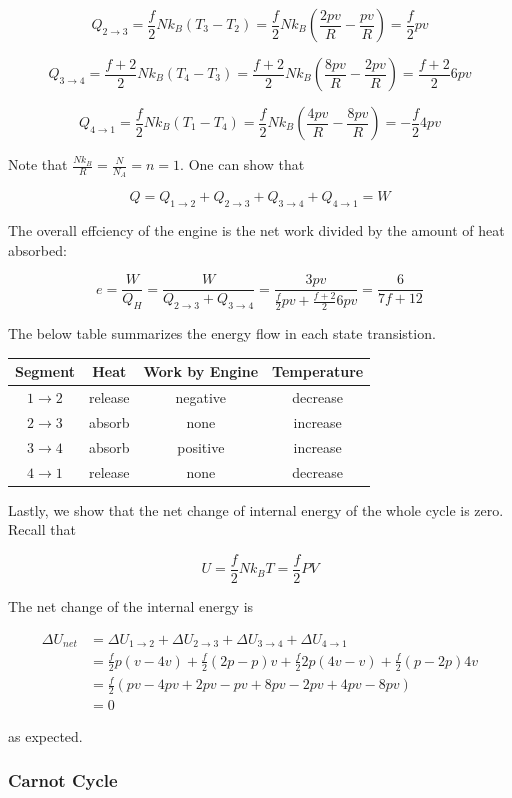 \documentclass[12pt, a4paper]{article}
\begin{document}
\[Q_{2\to3}=\frac{f}{2} Nk_B(T_3-T_2)=\frac{f}{2} Nk_B\left(\frac{2pv}{R}-\frac{pv}{R}\right)=\frac{f}{2} pv\]

\[Q_{3\to4}=\frac{f+2}{2} Nk_B(T_4-T_3)=\frac{f+2}{2} Nk_B\left(\frac{8pv}{R}-\frac{2pv}{R}\right)=\frac{f+2}{2} 6pv\]

\[Q_{4\to1}=\frac{f}{2} Nk_B(T_1-T_4)=\frac{f}{2} Nk_B\left(\frac{4pv}{R}-\frac{8pv}{R}\right)=-\frac{f}{2} 4pv\]

Note that $\frac{Nk_B}{R}=\frac{N}{N_A}=n=1$. One can show that

\[Q=Q_{1\to2}+Q_{2\to3}+Q_{3\to4}+Q_{4\to1}=W\]

The overall effciency of the engine is the net work divided by the amount of heat absorbed:

\[e=\frac{W}{Q_H}=\frac{W}{Q_{2\to3}+Q_{3\to4}}=\frac{3pv}{\frac{f}{2} pv+\frac{f+2}{2} 6pv}=\frac{6}{7f+12}\]

The below table summarizes the energy flow in each state transistion.

\begin{center}
\begin{tabular}{c|c|c|c}
  Segment & Heat & Work \textbf{by} Engine & Temperature \\
  \hline
  $1\to2$ & release & negative & decrease \\
  \hline
  $2\to3$ & absorb & none & increase \\
  \hline
  $3\to4$ & absorb & positive & increase \\
  \hline
  $4\to1$ & release & none & decrease
\end{tabular}
\end{center}

Lastly, we show that the net change of internal energy of the whole cycle is zero. Recall that

\[U=\frac{f}{2}Nk_BT=\frac{f}{2}PV\]

The net change of the internal energy is

\begin{align*}
\Delta U_{net} &= \Delta U_{1\to2}+\Delta U_{2\to3}+\Delta U_{3\to4}+\Delta U_{4\to1} \\
&= \frac{f}{2}p(v-4v)+\frac{f}{2}(2p-p)v+\frac{f}{2}2p(4v-v)+\frac{f}{2}(p-2p)4v \\
&=\frac{f}{2}(pv-4pv+2pv-pv+8pv-2pv+4pv-8pv) \\
&=0
\end{align*}

as expected.

\subsubsection{Carnot Cycle}
\end{document}
